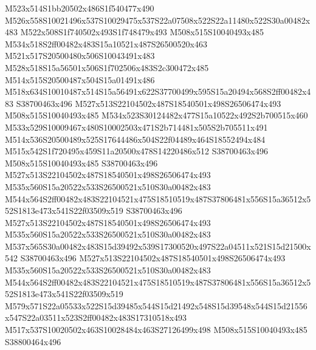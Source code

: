 \documentclass{article}
\begin{document}
\begin{multicols}{2}
M523x514S1bb20502x486S1f540477x490 M526x558S10021496x537S10029475x537S22a07508x522S22a11480x522S30a00482x483 M522x508S1f740502x493S1f748479x493 M508x515S10040493x485 M534x518S2ff00482x483S15a10521x487S26500520x463 M521x517S20500480x506S10043491x483 M528x518S15a56501x506S1f702506x483S2c300472x485 M514x515S20500487x504S15a01491x486 M518x634S10010487x514S15a56491x622S37700499x595S15a20494x568S2ff00482x483 S38700463x496 M527x513S22104502x487S18540501x498S26506474x493 M508x515S10040493x485 M534x523S30124482x477S15a10522x492S2b700515x460 M533x529S10009467x480S10002503x471S2b714481x505S2b705511x491 M514x536S20500489x525S17644486x504S22f04489x464S18552494x484 M515x542S1f720495x459S11a20500x478S14220486x512 S38700463x496 M508x515S10040493x485 S38700463x496 M527x513S22104502x487S18540501x498S26506474x493 M535x560S15a20522x533S26500521x510S30a00482x483 M544x564S2ff00482x483S22104521x475S18510519x487S37806481x556S15a36512x552S1813e473x541S22f03509x519 S38700463x496 M527x513S22104502x487S18540501x498S26506474x493 M535x560S15a20522x533S26500521x510S30a00482x483 M537x565S30a00482x483S15d39492x539S17300520x497S22a04511x521S15d21500x542 S38700463x496 M527x513S22104502x487S18540501x498S26506474x493 M535x560S15a20522x533S26500521x510S30a00482x483 M544x564S2ff00482x483S22104521x475S18510519x487S37806481x556S15a36512x552S1813e473x541S22f03509x519 M579x571S22a05533x522S15d39485x544S15d21492x548S15d39548x544S15d21556x547S22a03511x523S2ff00482x483S17310518x493 M517x537S10020502x463S10028484x463S27126499x498 M508x515S10040493x485 S38800464x496


\end{multicols}
\end{document}
